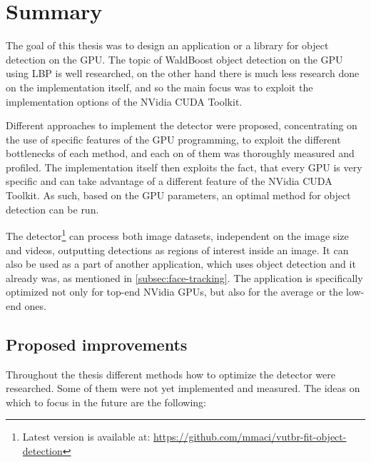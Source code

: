 \chapter{Summary}

The goal of this thesis was to design an application or a library for object detection on the GPU. The topic of WaldBoost object detection on the GPU using LBP is well researched, on the other hand there is much less research done on the implementation itself, and so the main focus was to exploit the implementation options of the NVidia CUDA Toolkit.

Different approaches to implement the detector were proposed, concentrating on the use of specific features of the GPU programming, to exploit the different bottlenecks of each method, and each on of them was thoroughly measured and profiled. The implementation itself then exploits the fact, that every GPU is very specific and can take advantage of a different feature of the NVidia CUDA Toolkit. As such, based on the GPU parameters, an optimal method for object detection can be run.

The detector\footnote{Latest version is available at: \url{https://github.com/mmaci/vutbr-fit-object-detection}} can process both image datasets, independent on the image size and videos, outputting detections as regions of interest inside an image. It can also be used as a part of another application, which uses object detection and it already was, as mentioned in \ref{subsec:face-tracking}. The application is specifically optimized not only for top-end NVidia GPUs, but also for the average or the low-end ones.

\section{Proposed improvements}

Throughout the thesis different methods how to optimize the detector were researched. Some of them were not yet implemented and measured. The ideas on which to focus in the future are the following:

